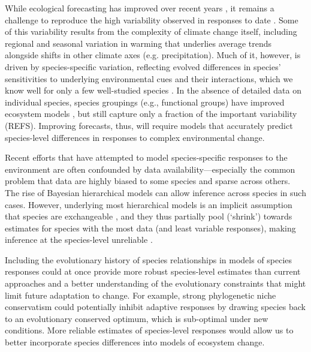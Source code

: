 \documentclass[11pt]{article}
\begin{document}
While ecological forecasting has improved over recent years \citep{dietze2017ecological,lewis2022power}, it remains a challenge to reproduce the high variability observed in responses to date \citep{IPCC:2014sm}. Some of this variability results from the complexity of climate change itself, including regional and seasonal variation in warming that underlies average trends alongside shifts in other climate axes (e.g. precipitation). Much of it, however, is driven by species-specific variation, reflecting evolved differences in species' sensitivities to underlying environmental cues and their interactions, which we know well for only a few well-studied species \citep{chuinearees,ettinger2020}. In the absence of detailed data on individual species, species groupings (e.g., functional groups) have improved ecosystem models \citep{ed2001,griffith2020}, but still capture only a fraction of the important variability (REFS). Improving forecasts, thus, will require models that accurately predict species-level differences in responses to complex environmental change.

Recent efforts that have attempted to model species-specific responses to the environment \citep{diez2012forecasting} are often confounded by data availability---especially the common problem that data are highly biased to some species and sparse across others. The rise of Bayesian hierarchical models can allow inference across species in such cases. However, underlying most hierarchical models is an implicit assumption that species are exchangeable \citep{gelman2006}, and they thus partially pool (`shrink') towards estimates for species with the most data (and least variable responses), making inference at the species-level unreliable \citep{ettinger2020}. 

Including the evolutionary history of species relationships in models of species responses could at once provide more robust species-level estimates than current approaches and a better understanding of the evolutionary constraints that might limit future adaptation to change. For example, strong phylogenetic niche conservatism \citep{wiens2010niche} could potentially inhibit adaptive responses by drawing species back to an evolutionary conserved optimum, which is sub-optimal under new conditions. More reliable estimates of species-level responses would allow us to better incorporate species differences into models of ecosystem change. 
\end{document}

